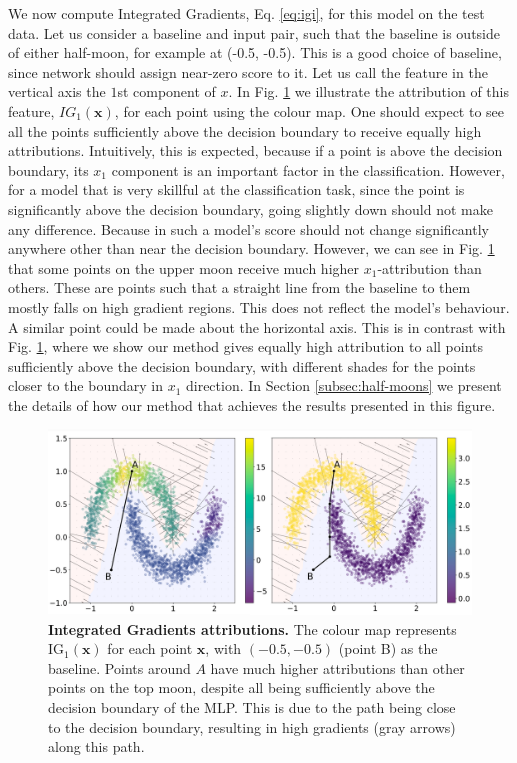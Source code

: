 We now compute Integrated Gradients, Eq. \ref{eq:igi}, for this model on the test data. Let us consider a baseline and input pair, such that the baseline is outside of either half-moon, for example at (-0.5, -0.5). This is a good choice of baseline, since network should assign near-zero score to it. Let us call the feature in the vertical axis the $1$st component of $x$. In Fig. \ref{fig:ig} we illustrate the attribution of this feature, $IG_1(\textbf{x})$, for each point using the colour map. One should expect to see all the points sufficiently above the decision boundary to receive equally high attributions. Intuitively, this is expected, because if a point is above the decision boundary, its $x_1$ component is an important factor in the classification. However, for a model that is very skillful at the classification task, since the point is significantly above the decision boundary, going slightly down should not make any difference. Because in such a model's score should not change significantly anywhere other than near the decision boundary. However, we can see in Fig. \ref{fig:ig} that some points on the upper moon receive much higher $x_1$-attribution than others. These are points such that a straight line from the baseline to them mostly falls on high gradient regions. This does not reflect the model's behaviour. A similar point could be made about the horizontal axis. This is in contrast with Fig. \ref{fig:ig}, where we show our method gives equally high attribution to all points sufficiently above the decision boundary, with different shades for the points closer to the boundary in $x_1$ direction. In Section \ref{subsec:half-moons} we present the details of how our method that achieves the results presented in this figure.

\begin{figure}[t!]
\vskip -0.1in
\begin{center}
\centerline{\includegraphics[width=\columnwidth]{figures/half_moons_y.png}}
\vskip -0.2in
\caption{\textbf{Integrated Gradients attributions.} The colour map represents $\textrm{IG}_1(\textbf{x})$ for each point $\textbf{x}$, with $(-0.5, -0.5)$ (point B) as the baseline. Points around $A$ have much higher attributions than other points on the top moon, despite all being sufficiently above the decision boundary of the MLP. This is due to the path being close to the decision boundary, resulting in high gradients (gray arrows) along this path.}
\label{fig:ig}
\end{center}
\vskip -0.2in
\end{figure}

